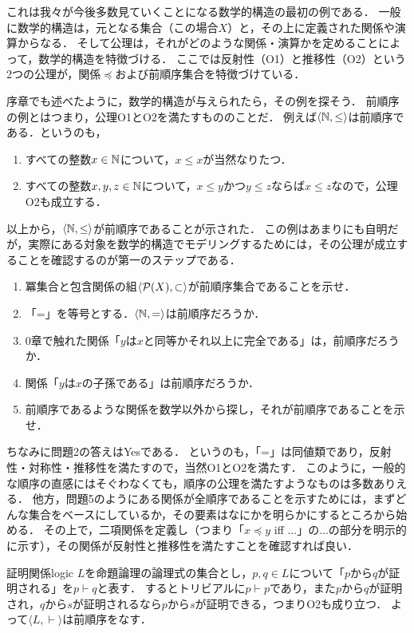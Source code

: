 \documentclass[dvipdfmx,11pt,a4paper]{jsarticle}
\begin{document}
これは我々が今後多数見ていくことになる数学的構造の最初の例である．
一般に数学的構造は，元となる集合（この場合$X$）と，その上に定義された関係や演算からなる．
そして公理は，それがどのような関係・演算かを定めることによって，数学的構造を特徴づける．
ここでは反射性（O1）と推移性（O2）という2つの公理が，関係$\preceq$および前順序集合を特徴づけている．

序章でも述べたように，数学的構造が与えられたら，その例を探そう．
前順序の例とはつまり，公理O1とO2を満たすもののことだ．
例えば$\langle \mathbb{N}, \leq \rangle$は前順序である．というのも，
\begin{enumerate}
 \item すべての整数$x \in \mathbb{N}$について，$x \leq x$が当然なりたつ．
 \item すべての整数$x, y, z \in \mathbb{N}$について，$x \leq y$かつ$y \leq z$ならば$x \leq z$なので，公理O2も成立する．
\end{enumerate}
以上から，$\langle \mathbb{N}, \leq \rangle$が前順序であることが示された．
この例はあまりにも自明だが，実際にある対象を数学的構造でモデリングするためには，その公理が成立することを確認するのが第一のステップである．

\begin{renshu}{}{}
\begin{enumerate}
 \item 冪集合と包含関係の組$\langle \mathcal{P}(X), \subset \rangle$が前順序集合であることを示せ． 
 \item 「=」を等号とする．$\langle \mathbb{N}, = \rangle$は前順序だろうか．
 \item 0章で触れた関係「$y$は$x$と同等かそれ以上に完全である」は，前順序だろうか．
 \item 関係「$y$は$x$の子孫である」は前順序だろうか．
 \item 前順序であるような関係を数学以外から探し，それが前順序であることを示せ．
\end{enumerate}
\end{renshu}

ちなみに問題2の答えはYesである．
というのも，「=」は同値類であり，反射性・対称性・推移性を満たすので，当然O1とO2を満たす．
このように，一般的な順序の直感にはそぐわなくても，順序の公理を満たすようなものは多数ありえる．
他方，問題5のようにある関係が全順序であることを示すためには，まずどんな集合をベースにしているか，その要素はなにかを明らかにするところから始める．
その上で，二項関係を定義し（つまり「$x \preceq y$ iff ...」の...の部分を明示的に示す），その関係が反射性と推移性を満たすことを確認すれば良い．

\begin{rei}{証明関係}{logic}
 $L$を命題論理の論理式の集合とし，$p, q \in L$について「$p$から$q$が証明される」を$p \vdash q$と表す．
 するとトリビアルに$p \vdash p$であり，また$p$から$q$が証明され，$q$から$s$が証明されるなら$p$から$s$が証明できる，つまりO2も成り立つ．
 よって$\langle L, \vdash \rangle$は前順序をなす．
\end{rei}
\end{document}
